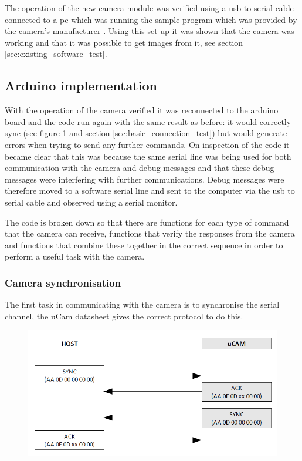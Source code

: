 The operation of the new camera module was verified using a usb to serial cable connected to a pc which was running the sample program which was provided by the camera's manufacturer \cite{ucam_test_software}. Using this set up it was shown that the camera was working and that it was possible to get images from it, see section \ref{sec:existing_software_test}.


\subsection{Arduino implementation}
\label{sec:arduino_imp}

With the operation of the camera verified it was reconnected to the arduino board and the code run again with the same result as before: it would correctly sync (see figure \ref{fig:syncProto} and section \ref{sec:basic_connection_test}) but would generate errors when trying to send any further commands. On inspection of the code it became clear that this was because the same serial line was being used for both communication with the camera and debug messages and that these debug messages were interfering with further communications. Debug messages were therefore moved to a software serial line and sent to the computer via the usb to serial cable and observed using a serial monitor.

The code is broken down so that there are functions for each type of command that the camera can receive, functions that verify the responses from the camera and functions that combine these together in the correct sequence in order to perform a useful task with the camera.

\subsubsection{Camera synchronisation}

The first task in communicating with the camera is to synchronise the serial channel, the uCam datasheet \cite{ucam_datasheet} gives the correct protocol to do this.

\begin{figure}[H]
        \centering
        \includegraphics[width=1.00\textwidth]{figures/SyncProtocal.png}
        \label{fig:syncProto}
\end{figure}

